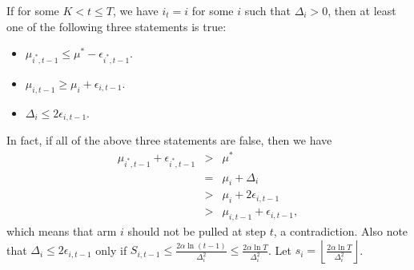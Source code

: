 \documentclass[openany]{book}
\theoremstyle{definition}
\theoremstyle{remark}
\begin{document}
If for some $K<t\le T$, we have $i_t=i$ for some $i$ such that $\Delta_i>0$, then at least one of the following three statements is true:
\begin{itemize}
    \item $\mu_{i^*,t-1}\le\mu^*-\epsilon_{i^*,t-1}$.
    \item $\mu_{i,t-1}\ge\mu_i+\epsilon_{i,t-1}$.
    \item $\Delta_i\le2\epsilon_{i,t-1}$.
\end{itemize}
In fact, if all of the above three statements are false, then we have
\begin{equation*}
    \begin{array}{rcl}
        \mu_{i^*,t-1}+\epsilon_{i^*,t-1} & > & \mu^* \\
         & = & \mu_i+\Delta_i \\
         & > & \mu_i+2\epsilon_{i,t-1} \\
         & > & \mu_{i,t-1}+\epsilon_{i,t-1},
    \end{array}
\end{equation*}
which means that arm $i$ should not be pulled at step $t$, a contradiction. Also note that $\Delta_i\le2\epsilon_{i,t-1}$ only if $S_{i,t-1}\le \frac{2\alpha\ln(t-1)}{\Delta_i^2}\le \frac{2\alpha\ln T}{\Delta_i^2}$. Let $s_i=\left\lfloor \frac{2\alpha\ln T}{\Delta_i^2}\right\rfloor$.
\end{document}
